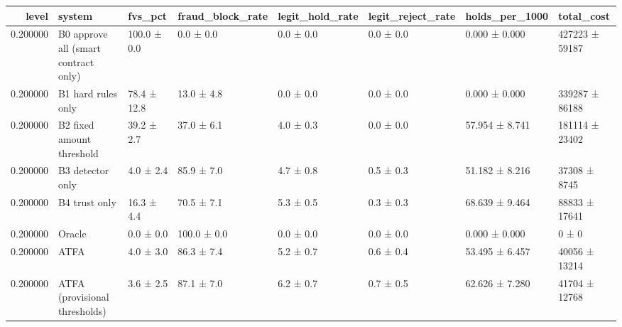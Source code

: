 \begin{tabular}{rlllllll}
\toprule
level & system & fvs\_pct & fraud\_block\_rate & legit\_hold\_rate & legit\_reject\_rate & holds\_per\_1000 & total\_cost \\
\midrule
0.200000 & B0 approve all (smart contract only) & 100.0 ± 0.0 & 0.0 ± 0.0 & 0.0 ± 0.0 & 0.0 ± 0.0 & 0.000 ± 0.000 & 427223 ± 59187 \\
0.200000 & B1 hard rules only & 78.4 ± 12.8 & 13.0 ± 4.8 & 0.0 ± 0.0 & 0.0 ± 0.0 & 0.000 ± 0.000 & 339287 ± 86188 \\
0.200000 & B2 fixed amount threshold & 39.2 ± 2.7 & 37.0 ± 6.1 & 4.0 ± 0.3 & 0.0 ± 0.0 & 57.954 ± 8.741 & 181114 ± 23402 \\
0.200000 & B3 detector only & 4.0 ± 2.4 & 85.9 ± 7.0 & 4.7 ± 0.8 & 0.5 ± 0.3 & 51.182 ± 8.216 & 37308 ± 8745 \\
0.200000 & B4 trust only & 16.3 ± 4.4 & 70.5 ± 7.1 & 5.3 ± 0.5 & 0.3 ± 0.3 & 68.639 ± 9.464 & 88833 ± 17641 \\
0.200000 & Oracle & 0.0 ± 0.0 & 100.0 ± 0.0 & 0.0 ± 0.0 & 0.0 ± 0.0 & 0.000 ± 0.000 & 0 ± 0 \\
0.200000 & ATFA & 4.0 ± 3.0 & 86.3 ± 7.4 & 5.2 ± 0.7 & 0.6 ± 0.4 & 53.495 ± 6.457 & 40056 ± 13214 \\
0.200000 & ATFA (provisional thresholds) & 3.6 ± 2.5 & 87.1 ± 7.0 & 6.2 ± 0.7 & 0.7 ± 0.5 & 62.626 ± 7.280 & 41704 ± 12768 \\
\bottomrule
\end{tabular}
